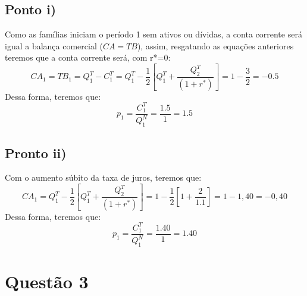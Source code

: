 \documentclass{article}
\begin{document}
\subsection*{Ponto i)}
Como as famílias iniciam o período 1 sem ativos ou dívidas, a conta corrente será igual a balança comercial ($CA=TB$), assim, resgatando as equações anteriores teremos que a conta corrente será, com r*=0:
\begin{equation*}
    CA_1=TB_1=Q_1^T-C_1^T=Q_1^T - \frac{1}{2}\left[Q_1^T  + \frac{Q_2^T}{(1+r^*)}\right] = 1 - \frac{3}{2}=-0.5
\end{equation*}
Dessa forma, teremos que:
\begin{equation*}
    p_1 = \frac{C_1^T}{Q_1^N} = \frac{1.5}{1} = 1.5
\end{equation*}

\subsection*{Pronto ii)}
Com o aumento súbito da taxa de juros, teremos que:
\begin{equation*}
    CA_1=Q_1^T - \frac{1}{2}\left[Q_1^T  + \frac{Q_2^T}{(1+r^*)}\right] = 1 - \frac{1}{2}\left[1+\frac{2}{1.1}\right]=1-1,40=-0,40
\end{equation*}
Dessa forma, teremos que:
\begin{equation*}
    p_1 = \frac{C_1^T}{Q_1^N} = \frac{1.40}{1} = 1.40
\end{equation*}
\section*{Questão 3}
\end{document}
